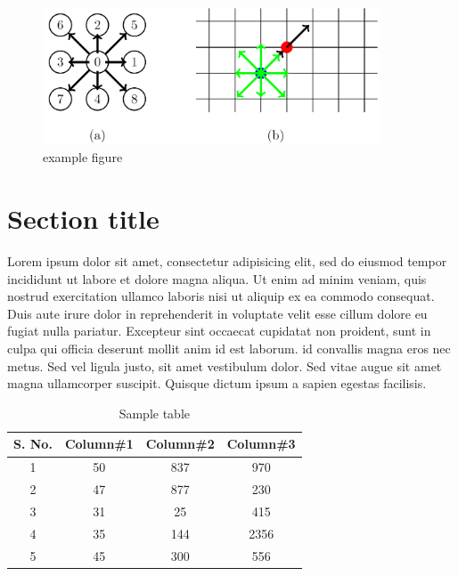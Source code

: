 \begin{figure}[H]
    \begin{center}
        \includegraphics[width=10cm]{logos/Gitter_LBM.png}
        \caption{example figure}
        \label{fig:mesh}
    \end{center}
\end{figure}


\section{Section title}
Lorem ipsum dolor sit amet, consectetur adipisicing elit, sed do eiusmod tempor incididunt ut labore et dolore magna aliqua. Ut enim ad minim veniam, quis nostrud exercitation ullamco laboris nisi ut aliquip ex ea commodo consequat. \\ Duis aute irure dolor in reprehenderit in voluptate velit esse cillum dolore eu fugiat nulla pariatur. Excepteur sint occaecat cupidatat non proident, sunt in culpa qui officia deserunt mollit anim id est laborum.
id convallis magna eros nec metus. Sed vel ligula justo, sit amet vestibulum dolor. Sed vitae augue sit amet magna ullamcorper suscipit. Quisque dictum ipsum a sapien egestas facilisis.

\begin{table}[ht]
    \caption{Sample table} %
    \centering %
    \begin{tabular}{c c c c}
        \hline\hline %
        S. No. & Column\#1 & Column\#2 & Column\#3 \\ [0.5ex]
        \hline %
        1      & 50        & 837       & 970       \\
        2      & 47        & 877       & 230       \\
        3      & 31        & 25        & 415       \\
        4      & 35        & 144       & 2356      \\
        5      & 45        & 300       & 556 \\ [1ex] %
        \hline %
    \end{tabular}
    \label{table:nonlin} %
\end{table}



